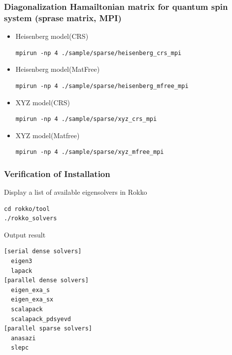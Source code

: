 \begin{frame}[c,fragile]
  \frametitle{Diagonalization Hamailtonian matrix for quantum spin system (sprase matrix, MPI)}
  \begin{itemize}
  \item Heisenberg model(CRS) 
\begin{lstlisting}[style=shstyle]
mpirun -np 4 ./sample/sparse/heisenberg_crs_mpi
\end{lstlisting}
  \item Heisenberg model(MatFree) 
\begin{lstlisting}[style=shstyle]
mpirun -np 4 ./sample/sparse/heisenberg_mfree_mpi
\end{lstlisting}
  \item XYZ model(CRS) 
\begin{lstlisting}[style=shstyle]
mpirun -np 4 ./sample/sparse/xyz_crs_mpi
\end{lstlisting}
  \item XYZ model(Matfree) 
\begin{lstlisting}[style=shstyle]
mpirun -np 4 ./sample/sparse/xyz_mfree_mpi
\end{lstlisting}
  \end{itemize}
\end{frame}


\begin{frame}[c,fragile]
  \frametitle{Verification of Installation}
Display a list of available eigensolvers in Rokko\\
\begin{lstlisting}[style=shstyle]
cd rokko/tool
./rokko_solvers
\end{lstlisting}

Output result
\begin{lstlisting}[style=shstyle]
[serial dense solvers]
  eigen3
  lapack
[parallel dense solvers]
  eigen_exa_s
  eigen_exa_sx
  scalapack
  scalapack_pdsyevd
[parallel sparse solvers]
  anasazi
  slepc
\end{lstlisting}

\end{frame}




